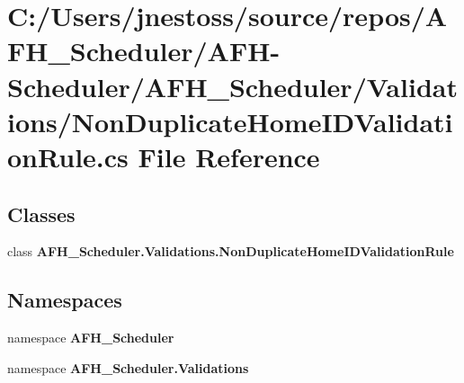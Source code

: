 \section{C\+:/\+Users/jnestoss/source/repos/\+A\+F\+H\+\_\+\+Scheduler/\+A\+F\+H-\/\+Scheduler/\+A\+F\+H\+\_\+\+Scheduler/\+Validations/\+Non\+Duplicate\+Home\+I\+D\+Validation\+Rule.cs File Reference}
\label{_non_duplicate_home_i_d_validation_rule_8cs}
\subsection*{Classes}
\begin{DoxyCompactItemize}
\item 
class \textbf{ A\+F\+H\+\_\+\+Scheduler.\+Validations.\+Non\+Duplicate\+Home\+I\+D\+Validation\+Rule}
\end{DoxyCompactItemize}
\subsection*{Namespaces}
\begin{DoxyCompactItemize}
\item 
namespace \textbf{ A\+F\+H\+\_\+\+Scheduler}
\item 
namespace \textbf{ A\+F\+H\+\_\+\+Scheduler.\+Validations}
\end{DoxyCompactItemize}

